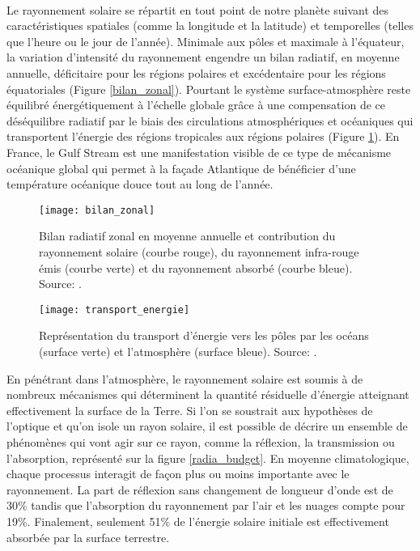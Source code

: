 ~\\
Le rayonnement solaire se répartit en tout point de notre planète suivant des caractéristiques spatiales (comme la longitude et la latitude) et temporelles (telles que l'heure ou le jour de l'année). Minimale aux pôles et maximale à l'équateur, la variation d'intensité du rayonnement engendre un bilan radiatif, en moyenne annuelle, déficitaire pour les régions polaires et excédentaire pour les régions équatoriales (Figure \ref{bilan_zonal}). 
Pourtant le système surface-atmosphère reste équilibré énergétiquement à l'échelle globale grâce à une compensation de ce déséquilibre radiatif par le biais des circulations atmosphériques et océaniques qui transportent l'énergie des régions tropicales aux régions polaires (Figure \ref{energie2}). En France, le Gulf Stream est une manifestation visible de ce type de mécanisme océanique global qui permet à la façade Atlantique de bénéficier d'une température océanique douce tout au long de l'année.\\

\begin{figure}[h!]
    \begin{minipage}[c]{.46\linewidth}
        \centering
        \texttt{[image: bilan\_zonal]}
    \caption{Bilan radiatif zonal en moyenne annuelle et contribution du rayonnement solaire (courbe rouge), du rayonnement infra-rouge émis (courbe verte) et du rayonnement absorbé (courbe bleue). Source: \citet{malardel2005}.}  
     \label{bilan_zonal}     
    \end{minipage}
    \hfill%
    \begin{minipage}[c]{.46\linewidth}
        \centering
        \texttt{[image: transport\_energie]}
        \caption{Représentation du transport d'énergie vers les pôles par les océans (surface verte) et l'atmosphère (surface bleue). Source: \citet{malardel2005}.}
        \label{energie2}
    \end{minipage}
\end{figure}

\noindent En pénétrant dans l'atmosphère, le rayonnement solaire est soumis à de nombreux mécanismes qui déterminent la quantité résiduelle d'énergie atteignant effectivement la surface de la Terre. Si l'on se soustrait aux hypothèses de l'optique et qu'on isole un rayon solaire, il est possible de décrire un ensemble de phénomènes qui vont agir sur ce rayon, comme la réflexion, la transmission ou l'absorption, représenté sur la figure \ref{radia_budget}. En moyenne climatologique, chaque processus interagit de façon plus ou moins importante avec le rayonnement. La part de réflexion sans changement de longueur d'onde est de 30\% tandis que l'absorption du rayonnement par l'air et les nuages compte pour 19\%. Finalement, seulement 51\% de l'énergie solaire initiale est effectivement absorbée par la surface terrestre.\\

